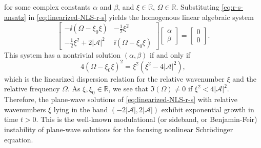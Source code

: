 for some complex constants $\alpha$ and $\beta$, and $\xi\in\mathbb{R}$, $\Omega\in\mathbb{R}$. Substituting \eqref{eq:r-s-ansatz} in \eqref{eq:linearized-NLS-r-s} yields the homogenous linear algebraic system
\begin{equation}
\begin{bmatrix}
-\ii(\Omega -\xi_0 \xi) & -\frac{1}{2}\xi^2 \\  -\frac{1}{2}\xi^2 + 2 |\mathcal{A}|^2 & \ii(\Omega - \xi_0 \xi)
\end{bmatrix}
\begin{bmatrix}
\alpha \\ \beta
\end{bmatrix}
=
\begin{bmatrix}
0 \\ 0
\end{bmatrix}.
\end{equation}
This system has a nontrivial solution $(\alpha,\beta)$ if and only if 
\begin{equation}
4 (\Omega - \xi_0 \xi)^2 = \xi^2 \left(\xi^2 - 4|\mathcal{A}|^2 \right),
\label{eq:linearized-dispersion}
\end{equation}
which is the linearized dispersion relation for the relative wavenumber $\xi$ and the relative frequency $\Omega$. As $\xi,\xi_0\in\mathbb{R}$, we see that $\Im(\Omega) \neq 0$ if $\xi^2< 4|\mathcal{A}|^2$. Therefore, the plane-wave solutions of \eqref{eq:linearized-NLS-r-s} with relative wavenumbers $\xi$ lying in the band $(-2 |\mathcal{A}|, 2 |\mathcal{A}|)$ exhibit exponential growth in time $t>0$.  This is the well-known modulational (or sideband, or Benjamin-Feir) instability of plane-wave solutions for the focusing nonlinear Schr\"odinger equation.